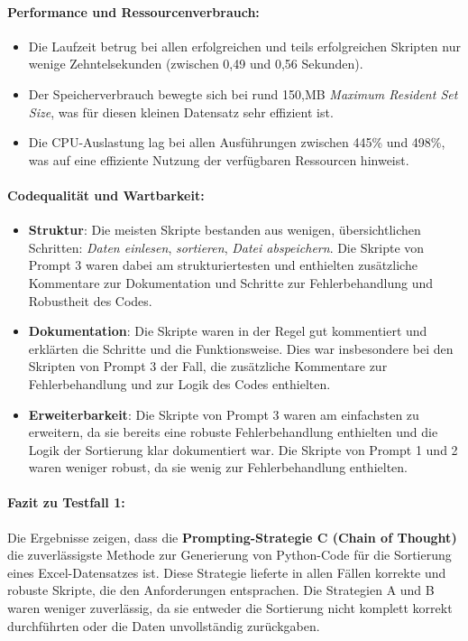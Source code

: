 \documentclass[11pt,a4paper]{article}
\begin{document}
\paragraph{Performance und Ressourcenverbrauch:}
\begin{itemize}
    \item Die Laufzeit betrug bei allen erfolgreichen und teils erfolgreichen Skripten nur wenige Zehntelsekunden (zwischen 0,49 und 0,56 Sekunden).
    \item Der Speicherverbrauch bewegte sich bei rund 150,MB \emph{Maximum Resident Set Size}, was für diesen kleinen Datensatz sehr effizient ist.
    \item Die CPU-Auslastung lag bei allen Ausführungen zwischen 445\% und 498\%, was auf eine effiziente Nutzung der verfügbaren Ressourcen hinweist.
\end{itemize}
    
\paragraph{Codequalität und Wartbarkeit:}
\begin{itemize}
    \item \textbf{Struktur}: Die meisten Skripte bestanden aus wenigen, übersichtlichen Schritten: \emph{Daten einlesen}, \emph{sortieren}, \emph{Datei abspeichern}. Die Skripte von Prompt 3 waren dabei am strukturiertesten und enthielten zusätzliche Kommentare zur Dokumentation und Schritte zur Fehlerbehandlung und Robustheit des Codes.
    \item \textbf{Dokumentation}: Die Skripte waren in der Regel gut kommentiert und erklärten die Schritte und die Funktionsweise. Dies war insbesondere bei den Skripten von Prompt 3 der Fall, die zusätzliche Kommentare zur Fehlerbehandlung und zur Logik des Codes enthielten.
    \item \textbf{Erweiterbarkeit}: Die Skripte von Prompt 3 waren am einfachsten zu erweitern, da sie bereits eine robuste Fehlerbehandlung enthielten und die Logik der Sortierung klar dokumentiert war. Die Skripte von Prompt 1 und 2 waren weniger robust, da sie wenig zur Fehlerbehandlung enthielten.
\end{itemize}
    
\paragraph{Fazit zu Testfall 1:}
Die Ergebnisse zeigen, dass die \textbf{Prompting-Strategie C (Chain of Thought)} die zuverlässigste Methode zur Generierung von Python-Code für die Sortierung eines Excel-Datensatzes ist. Diese Strategie lieferte in allen Fällen korrekte und robuste Skripte, die den Anforderungen entsprachen. Die Strategien A und B waren weniger zuverlässig, da sie entweder die Sortierung nicht komplett korrekt durchführten oder die Daten unvollständig zurückgaben.
\end{document}
